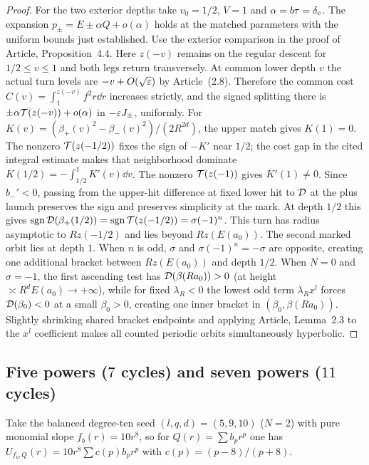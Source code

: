 \begin{proof}
For the two exterior depths take $v_0=1/2$, $V=1$ and
$\alpha=b\tau=\delta_{\rm c}$. The expansion $p_\pm=E\pm\alpha Q+o(\alpha)$
holds at the matched parameters with the uniform bounds just established.
Use the exterior comparison in the proof of Article, Proposition~4.4.
Here $z(-v)$ remains on the regular descent for $1/2\le v\le1$ and
both legs return transversely. At common lower depth $v$ the actual
turn levels are $-v+O(\sqrt{\varepsilon})$ by Article~(2.8). Therefore the
common cost $C(v)=\int_1^{z(-v)} f^2r\dd r$ increases strictly, and
the signed splitting there is $\pm\alpha\mathcal{T}(z(-v))+o(\alpha)$ in
$-\varepsilon J_\pm$, uniformly. For $K(v)=(\beta_+(v)^2-\beta_-(v)^2)/(2R^{2d})$,
the upper match gives $K(1)=0$. The nonzero $\mathcal{T}(z(-1/2))$ fixes the
sign of $-K'$ near $1/2$; the cost gap in the cited integral estimate
makes that neighborhood dominate $K(1/2)=-\int_{1/2}^1K'(v)\dd v$.
The nonzero $\mathcal{T}(z(-1))$ gives $K'(1)\ne0$. Since $b_-'<0$, passing
from the upper-hit difference at fixed lower hit to $\mathcal{D}$ at the
plus launch preserves the sign and preserves simplicity at the mark.
At depth $1/2$ this gives $\operatorname{sgn}\mathcal{D}(\beta_+(1/2))
=\operatorname{sgn}\mathcal{T}(z(-1/2))=\sigma(-1)^n$. This turn has radius asymptotic to
$Rz(-1/2)$ and lies beyond $Rz(E(a_0))$. The second marked orbit
lies at depth $1$. When $n$ is odd, $\sigma$ and $\sigma(-1)^n=-\sigma$ are opposite, creating one
additional bracket between $Rz(E(a_0))$ and depth $1/2$. When $N=0$ and $\sigma=-1$, the first
ascending test has $\mathcal{D}(\beta(Ra_0))>0$ (at height $\asymp R^d E(a_0)\to+\infty$), while for fixed
$\lambda_R<0$ the lowest odd term $\lambda_R x^l$ forces $\mathcal{D}(\beta_0)<0$ at a small $\beta_0>0$,
creating one inner bracket in $(\beta_0,\beta(Ra_0))$. Slightly shrinking shared bracket endpoints and
applying Article, Lemma~2.3 to the $x^l$ coefficient makes all counted periodic orbits
simultaneously hyperbolic.
\end{proof}

\subsection{Five powers ($7$ cycles) and seven powers ($11$ cycles)}\label{subsec:five-seven}
Take the balanced degree-ten seed $(l,q,d)=(5,9,10)$ ($N=2$) with pure monomial slope $f_b(r)=10r^8$,
so for $Q(r)=\sum b_p r^p$ one has $U_{f_b,Q}(r)=10r^8\sum c(p)b_p r^p$ with $c(p)=(p-8)/(p+8)$.

